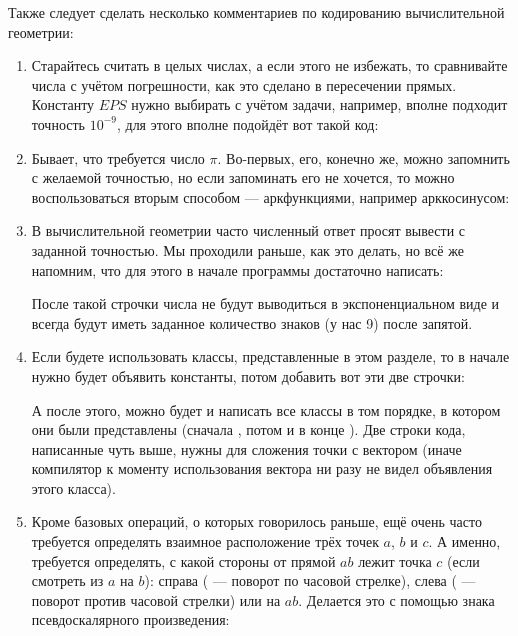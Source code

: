 Также следует сделать несколько комментариев по кодированию вычислительной геометрии:

\begin{enumerate}
    \item Старайтесь считать в целых числах, а если этого не избежать, то сравнивайте числа с учётом погрешности, как это сделано в пересечении прямых. Константу $EPS$ нужно выбирать с учётом задачи, например, вполне подходит точность $10^{-9}$, для этого вполне подойдёт вот такой код:
    
    \nocode
    
    \item Бывает, что требуется число $\pi$. Во-первых, его, конечно же, можно запомнить с желаемой точностью, но если запоминать его не хочется, то можно воспользоваться вторым способом — аркфункциями, например арккосинусом:
    
    \nocode
    
    \item В вычислительной геометрии часто численный ответ просят вывести с заданной точностью. Мы проходили раньше, как это делать, но всё же напомним, что для этого в начале программы достаточно написать:
    
    \nocode
    
    После такой строчки числа не будут выводиться в экспоненциальном виде и всегда будут иметь заданное количество знаков (у нас 9) после запятой.
    
    \item Если будете использовать классы, представленные в этом разделе, то в начале нужно будет объявить константы, потом добавить вот эти две строчки:
    
    \nocode
    
    А после этого, можно будет и написать все классы в том порядке, в котором они были представлены (сначала , потом  и в конце ). Две строки кода, написанные чуть выше, нужны для сложения точки с вектором (иначе компилятор к моменту использования вектора ни разу не видел объявления этого класса).
    
    \item Кроме базовых операций, о которых говорилось раньше, ещё очень часто требуется определять взаимное расположение трёх точек $a$, $b$ и $c$. А именно, требуется определять, с какой стороны от прямой $ab$ лежит точка $c$ (если смотреть из $a$ на $b$): справа ( — поворот по часовой стрелке), слева ( — поворот против часовой стрелки) или на $ab$. Делается это с помощью знака псевдоскалярного произведения:
    
    \nocode
\end{enumerate}
